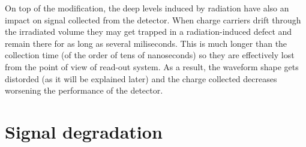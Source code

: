 On top of the \neff modification, the deep levels induced by radiation have also an impact on signal collected from the detector. When charge carriers drift through the irradiated volume they may get trapped in a radiation-induced defect and remain there for as long as several miliseconds. This is much longer than the collection time (of the order of tens of nanoseconds) so they are effectively lost from the point of view of read-out system. As a result, the waveform shape gets distorded (as it will be explained later) and the charge collected decreases worsening the performance of the detector.

\section{Signal degradation} %



